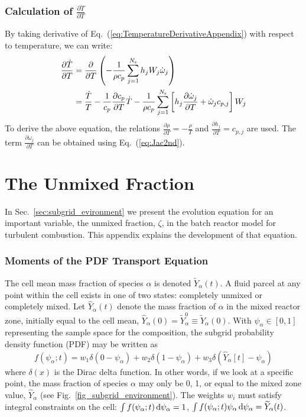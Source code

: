 \subsection*{Calculation of $\frac{\partial \dot{T}}{\partial T}$}
By taking derivative of Eq.~(\ref{eq:TemperatureDerivativeAppendix}) with respect to temperature, we can write:
\begin{equation} \label{eq:Jac4th}
\begin{aligned}
\frac{\partial \dot{T}}{\partial T} &= \frac{\partial}{\partial T} \left( -\frac{1}{\rho c_p} \sum_{j=1}^{N_{\rm s}}h_j W_j \dot{\omega}_j  \right) \\
&=\frac{\dot{T}}{T} - \frac{1}{c_p} \frac{\partial c_p}{\partial T} \dot{T} - \frac{1}{\rho c_p} \sum_{j=1}^{N_{\rm s}} \left[ h_j  \frac{\partial \dot{\omega}_j}{\partial T} +  \dot{\omega}_j c_{p,j} \right] W_j
\end{aligned}
\end{equation}
To derive the above equation, the relations $\frac{\partial \rho}{\partial T} = -\frac{\rho}{T}$ and $\frac{\partial h_j}{\partial T} = c_{p,j}$ are used. The term $\frac{\partial \dot{\omega}_j}{\partial T}$ can be obtained using Eq.~(\ref{eq:Jac2nd}).


\chapter{The Unmixed Fraction}
\label{app:unmixed_fraction}

In Sec.~\ref{sec:subgrid_evironment} we present the evolution equation for an important variable, the unmixed fraction, $\zeta$, in the batch reactor model for turbulent combustion.  This appendix explains the development of that equation.

\subsection*{Moments of the PDF Transport Equation}
\label{app:pdf_transport}

The cell mean mass fraction of species $\alpha$ is denoted $\widetilde{Y}_\alpha(t)$. A fluid parcel at any point within the cell exists in one of two states: completely unmixed or completely mixed.  Let $\hat{Y}_\alpha(t)$ denote the mass fraction of $\alpha$ in the mixed reactor zone, initially equal to the cell mean, $\hat{Y}_\alpha(0) = \widetilde{Y}_{\alpha}^0 \equiv \widetilde{Y}_{\alpha}(0)$.  With $\psi_\alpha \in [0,1]$ representing the sample space for the composition, the subgrid probability density function (PDF) may be written as
\begin{equation}
\label{eq:pdf}
f(\psi_\alpha;t) = w_1 \delta(0-\psi_\alpha) + w_2 \delta(1-\psi_\alpha) + w_3 \delta(\hat{Y}_\alpha[t] - \psi_\alpha)
\end{equation}
where $\delta(x)$ is the Dirac delta function.  In other words, if we look at a specific point, the mass fraction of species $\alpha$ may only be 0, 1, or equal to the mixed zone value, $\hat{Y}_\alpha$ (see Fig.~\ref{fig_subgrid_environment}).  The weights $w_i$ must satisfy integral constraints on the cell: $\int f(\psi_\alpha;t) \,\mathrm{d} \psi_\alpha = 1$, $\int f(\psi_\alpha;t) \psi_\alpha \,\mathrm{d} \psi_\alpha = \widetilde{Y}_\alpha(t)$.

